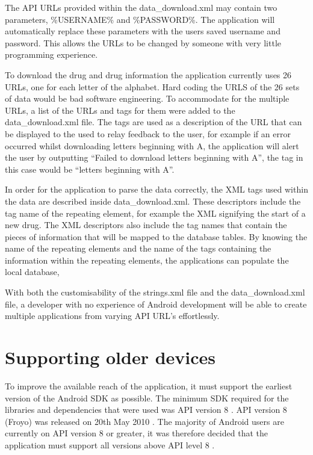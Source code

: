 The API URLs provided within the data\_download.xml may contain two parameters, \%USERNAME\% and \%PASSWORD\%. The application will automatically replace these parameters with the users saved username and password. This allows the URLs to be changed by someone with very little programming experience.

To download the drug and drug information the application currently uses 26 URLs, one for each letter of the alphabet. Hard coding the URLS of the 26 sets of data would be bad software engineering. To accommodate for the multiple URLs, a list of the URLs and tags for them were added to the data\_download.xml file. The tags are used as a description of the URL that can be displayed to the used to relay feedback to the user, for example if an error occurred whilst downloading letters beginning with A, the application will alert the user by outputting “Failed to download letters beginning with A”, the tag in this case would be “letters beginning with A”. 

In order for the application to parse the data correctly, the XML tags \cite{xml} used within the data are described inside data\_download.xml. These descriptors include the tag name of the repeating element, for example the XML signifying the start of a new drug. The XML descriptors also include the tag names that contain the pieces of information that will be mapped to the database tables. By knowing the name of the repeating elements and the name of the tags containing the information within the repeating elements, the applications can populate the local database,

With both the customisability of the strings.xml file and the data\_download.xml file, a developer with no experience of Android development will be able to create multiple applications from varying API URL's effortlessly. 


\section{Supporting older devices}
To improve the available reach of the application, it must support the earliest version of the Android SDK \cite{android_sdk} as possible. The minimum SDK required for the libraries and dependencies that were used was API version 8 \cite{robospice}. API version 8 (Froyo) was released on 20th May 2010 \cite{froyo}. The majority of Android users are currently on API version 8 or greater, it was therefore decided that the application must support all versions above API level 8 \cite{phone_market}.

